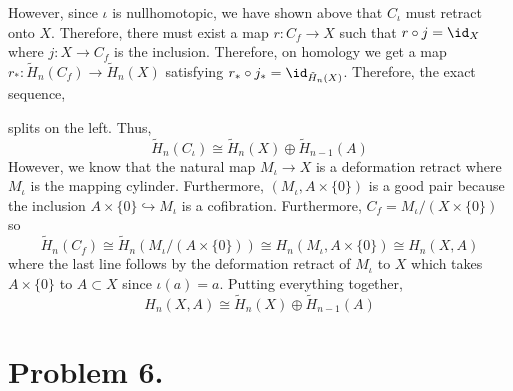 \documentclass[12pt]{extarticle}
\begin{document}
However, since $\iota$ is nullhomotopic, we have shown above that $C_\iota$ must retract onto $X$. Therefore, there must exist a map $r : C_f \to X$ such that $r \circ j = \id_{X}$ where $j : X \to C_f$ is the inclusion. Therefore, on homology we get a map $r_* : \tilde{H}_n(C_f) \to \tilde{H}_n(X)$ satisfying $r_* \circ j_* = \id_{\tilde{H}_n(X)}$. Therefore, the exact sequence,
\begin{center}
\end{center}
splits on the left. Thus,
\[ \tilde{H}_n(C_\iota) \cong \tilde{H}_n(X) \oplus \tilde{H}_{n-1}(A) \]
However, we know that the natural map $M_\iota \to X$ is a deformation retract where $M_\iota$ is the mapping cylinder. Furthermore, $(M_\iota, A \times \{0\})$ is a good pair because the inclusion $A \times \{0\} \hookrightarrow M_\iota$ is a cofibration. Furthermore, $C_f = M_\iota / (X \times \{0\})$ so
\[ \tilde{H}_n(C_f) \cong \tilde{H}_n(M_\iota / (A \times \{0\})) \cong H_n(M_\iota, A \times \{0\}) \cong H_n(X, A) \] 
where the last line follows by the deformation retract of $M_\iota$ to $X$ which takes $A \times \{0\}$ to $A \subset X$ since $\iota(a) = a$.  
Putting everything together,
\[ H_n(X, A) \cong \tilde{H}_{n}(X) \oplus \tilde{H}_{n-1}(A) \]

\section*{Problem 6.}
\end{document}

